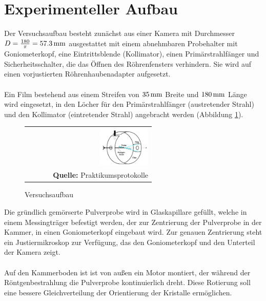 \documentclass[a4paper,titlepage]{scrartcl}
\numberwithin{equation}{section}
\begin{document}
\section{Experimenteller Aufbau}
Der Versuchsaufbau besteht zunächst aus einer Kamera mit Durchmesser $D=\frac{180}{\pi}=\unit[57.3]{mm}$ ausgestattet mit einem abnehmbaren Probehalter mit Goniometerkopf, eine Eintrittsblende (Kollimator), einen Primärstrahlfänger und Sicherheitsschalter, die das Öffnen des Röhrenfensters verhindern. Sie wird auf einen vorjustierten Röhrenhaubenadapter aufgesetzt.\\ \\
Ein Film bestehend aus einem Streifen von $\unit[35]{mm}$ Breite und $\unit[180]{mm}$ Länge wird eingesetzt, in den Löcher für den Primärstrahlfänger (austretender Strahl) und den Kollimator (eintretender Strahl) angebracht werden (Abbildung \ref{fig:aufbau}).
\begin{figure}[H]
	\centering
	\begin{tabular}{@{}r@{}}
		\includegraphics[width=0.4\textwidth]{images/aufbau.PNG}\\
		\footnotesize\sffamily\textbf{Quelle:} Praktikumsprotokolle \cite{protokoll1}
	\end{tabular}
	\caption{Versuchsaufbau}
    \label{fig:aufbau}
\end{figure}
Die gründlich gemörserte Pulverprobe wird in Glaskapillare gefüllt, welche in einem Messingträger befestigt werden, der zur Zentrierung der Pulverprobe in der Kammer, in einen Goniometerkopf eingebaut wird. Zur genauen Zentrierung steht ein Justiermikroskop zur Verfügung, das den Goniometerkopf und den Unterteil der Kamera zeigt.\\ \\
Auf den Kammerboden ist ist von außen ein Motor montiert, der während der Röntgenbestrahlung die Pulverprobe kontinuierlich dreht. Diese Rotierung soll eine bessere Gleichverteilung der Orientierung der Kristalle ermöglichen.
\end{document}
